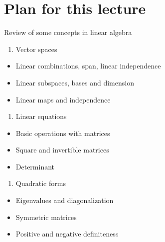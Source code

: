 \documentclass[letterpaper,10pt,english]{jupyterBook}
\begin{document}
\section{Plan for this lecture}
\label{\detokenize{05.linear_algebra:plan-for-this-lecture}}
\sphinxAtStartPar
Review of some concepts in linear algebra
\begin{enumerate}
%
\item {} 
\sphinxAtStartPar
Vector spaces

\end{enumerate}
\begin{itemize}
\item {} 
\sphinxAtStartPar
Linear combinations, span, linear independence

\item {} 
\sphinxAtStartPar
Linear subspaces, bases and dimension

\item {} 
\sphinxAtStartPar
Linear maps and independence

\end{itemize}
\begin{enumerate}
%
\setcounter{enumi}{1}
\item {} 
\sphinxAtStartPar
Linear equations

\end{enumerate}
\begin{itemize}
\item {} 
\sphinxAtStartPar
Basic operations with matrices

\item {} 
\sphinxAtStartPar
Square and invertible matrices

\item {} 
\sphinxAtStartPar
Determinant

\end{itemize}
\begin{enumerate}
%
\setcounter{enumi}{2}
\item {} 
\sphinxAtStartPar
Quadratic forms

\end{enumerate}
\begin{itemize}
\item {} 
\sphinxAtStartPar
Eigenvalues and diagonalization

\item {} 
\sphinxAtStartPar
Symmetric matrices

\item {} 
\sphinxAtStartPar
Positive and negative definiteness

\end{itemize}
\end{document}
